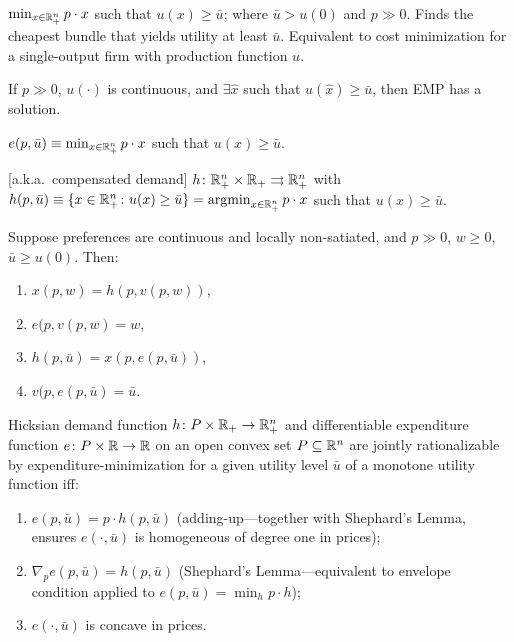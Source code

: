 \documentclass[8pt,letterpaper, landscape]{extarticle} %
\begin{document}
\begin{multicols}{3}
\begin{description}
 $ \min_{x \in \mathbb{R}^{n}_{+}} p \cdot x $ such that $ u(x) \geq \bar{u} $; where $ \bar{u} > u(0) $ and $ p \gg 0 $. Finds the cheapest bundle that yields utility at least $ \bar{u} $. Equivalent to cost minimization for a single-output firm with production function $ u $.

If $ p \gg 0 $, $ u (\cdot) $ is continuous, and $ \exists \hat{x} $ such that $ u(\hat{x}) \geq \bar{u} $, then EMP has a solution.

 $ e(p, \bar{u}) \equiv \min_{x \in \mathbb{R}^{n}_{+}} p \cdot x $ such that $ u(x) \geq \bar{u} $. 

 [a.k.a.\ compensated demand] $ h \colon \mathbb{R}^{n}_{+} \times \mathbb{R}_{+} \rightrightarrows \mathbb{R}^{n}_{+} $ with $ h(p,\bar{u}) \equiv \{ x \in \mathbb{R}^{n}_{+} \colon u(x) \geq \bar{u} \} = \operatorname*{argmin}_{x \in \mathbb{R}^{n}_{+}} p \cdot x $ such that $ u(x) \geq \bar{u} $.

 Suppose preferences are continuous and locally non-satiated, and $ p \gg 0 $, $ w \geq 0 $, $ \bar{u} \geq u(0) $. Then:
\begin{enumerate}
\item $ x(p,w) = h(p,v(p,w)) $,
\item $ e(p,v(p,w) = w $,
\item $ h(p, \bar{u}) = x(p,e(p,\bar{u})) $,
\item $ v(p,e(p,\bar{u}) = \bar{u} $.
\end{enumerate}

 Hicksian demand function $ h \colon P \times \mathbb{R}_{+} \to \mathbb{R}^{n}_{+}  $ and differentiable expenditure function $ e \colon P \times \mathbb{R} \to \mathbb{R} $ on an open convex set $ P \subseteq \mathbb{R}^n $ are jointly rationalizable by expenditure-minimization for a given utility level $ \bar{u} $ of a monotone utility function iff:
\begin{enumerate}
\item $ e(p, \bar{u}) = p \cdot h(p, \bar{u}) $ (adding-up---together with Shephard's Lemma, ensures $ e (\cdot, \bar{u}) $ is homogeneous of degree one in prices);
\item $ \nabla_{p} e(p, \bar{u}) = h(p,\bar{u}) $ (Shephard's Lemma---equivalent to envelope condition applied to $ e(p, \bar{u}) = \min_{h} p \cdot h $);
\item $ e(\cdot, \bar{u}) $ is concave in prices.
\end{enumerate}


\end{description}
\end{multicols}
\end{document}
